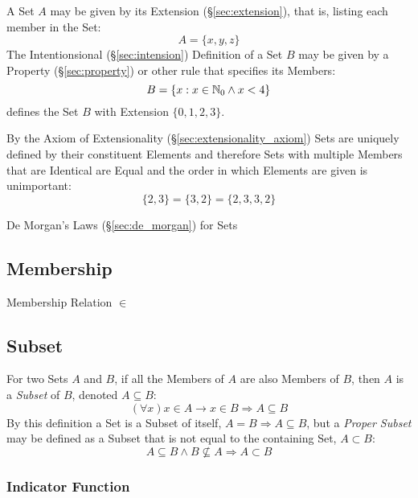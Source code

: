 A Set $A$ may be given by its Extension (\S\ref{sec:extension}), that
is, listing each member in the Set:
\[
  A = \{x,y,z\}
\]
The Intentionsional (\S\ref{sec:intension}) Definition of a Set $B$
may be given by a Property (\S\ref{sec:property}) or other rule that
specifies its Members:
\[
  B = \{ x : x \in \mathbb{N}_0 \wedge x < 4 \}
\]
defines the Set $B$ with Extension $\{ 0, 1, 2, 3 \}$.

By the Axiom of Extensionality (\S\ref{sec:extensionality_axiom}) Sets
are uniquely defined by their constituent Elements and therefore Sets
with multiple Members that are Identical are Equal and the order in
which Elements are given is unimportant:
\[
  \{ 2, 3 \} = \{ 3, 2 \} = \{ 2, 3, 3, 2 \}
\]

De Morgan's Laws (\S\ref{sec:de_morgan}) for Sets



\subsection{Membership}\label{sec:membership}

Membership Relation $\in$



\subsection{Subset}\label{sec:subset}

For two Sets $A$ and $B$, if all the Members of $A$ are also Members
of $B$, then $A$ is a \emph{Subset} of $B$, denoted $A \subseteq B$:
\[
  (\forall x) x \in A \rightarrow x \in B \Rightarrow A \subseteq B
\]
By this definition a Set is a Subset of itself, $A = B \Rightarrow A
\subseteq B$, but a \emph{Proper Subset} may be defined as a Subset
that is not equal to the containing Set, $A \subset B$:
\[
  A \subseteq B \wedge B \nsubseteq A \Rightarrow A \subset B
\]



\subsubsection{Indicator Function}\label{sec:indicator_function}



